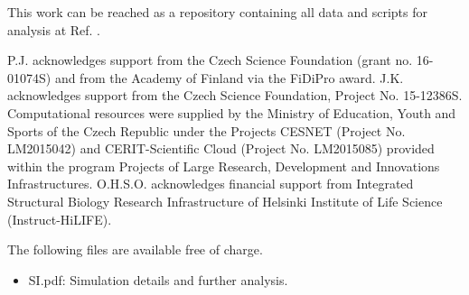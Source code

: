 \documentclass[journal=jpcbfk,manuscript=article]{achemso}
\begin{document}
This work can be reached as a repository containing all data and scripts for analysis at Ref. .


\begin{acknowledgement}
P.J. acknowledges support from the Czech Science Foundation (grant no. 16-01074S) 
and from the Academy of Finland via the FiDiPro award.
J.K. acknowledges support from the Czech Science Foundation, Project No. 15-12386S.
Computational resources were supplied by the Ministry of Education, Youth and Sports
of the Czech Republic under the Projects CESNET (Project No. LM2015042) and CERIT-Scientific
Cloud (Project No. LM2015085) provided within the program Projects of Large Research,
Development and Innovations Infrastructures.
O.H.S.O. acknowledges financial support from
Integrated Structural Biology Research Infrastructure of
Helsinki Institute of Life Science (Instruct-HiLIFE).
\end{acknowledgement}

\begin{suppinfo}


The following files are available free of charge.
\begin{itemize}
  \item SI.pdf: Simulation details and further analysis.
\end{itemize}

\end{suppinfo}



\end{document}
